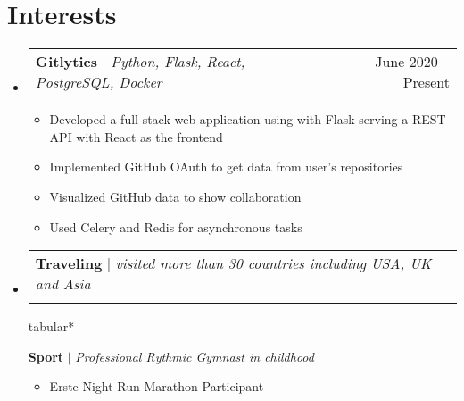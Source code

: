 \documentclass[letterpaper,11pt]{article}
\makeatletter
\newcommand{\resumeItem}[1]{
  \item\small{
    {#1 \vspace{-2pt}}
  }
}
\newcommand{\resumeProjectHeading}[2]{
    \item
    \begin{tabular*}{0.97\textwidth}{l@{\extracolsep{\fill}}r}
      \small#1 & #2 \\
    \end{tabular*}\vspace{-7pt}
}
\newcommand{\resumeSubHeadingListStart}{\begin{itemize}[leftmargin=0.15in, label={}]}
\newcommand{\resumeSubHeadingListEnd}{\end{itemize}}
\newcommand{\resumeItemListStart}{\begin{itemize}}
\newcommand{\resumeItemListEnd}{\end{itemize}\vspace{-5pt}}
\makeatother
\begin{document}
  
\section{Interests }
    \resumeSubHeadingListStart
        \resumeProjectHeading
          {\textbf{Gitlytics} $|$ \emph{Python, Flask, React, PostgreSQL, Docker}}{June 2020 -- Present}
          \resumeItemListStart
            \resumeItem{Developed a full-stack web application using with Flask serving a REST API with React as the frontend}
            \resumeItem{Implemented GitHub OAuth to get data from user’s repositories}
            \resumeItem{Visualized GitHub data to show collaboration}
            \resumeItem{Used Celery and Redis for asynchronous tasks}
          \resumeItemListEnd
          
      \resumeProjectHeading
          {\textbf{Traveling} $|$ \emph { visited more than 30 countries including USA, UK and Asia }}
        

      \resumeProjectHeading
          {\textbf{Sport} $|$ \emph {Professional Rythmic Gymnast in childhood}}{}
          \resumeItemListStart
            \resumeItem{ Erste Night Run Marathon Participant} 
            
          \resumeItemListEnd
    \resumeSubHeadingListEnd

\end{document}
